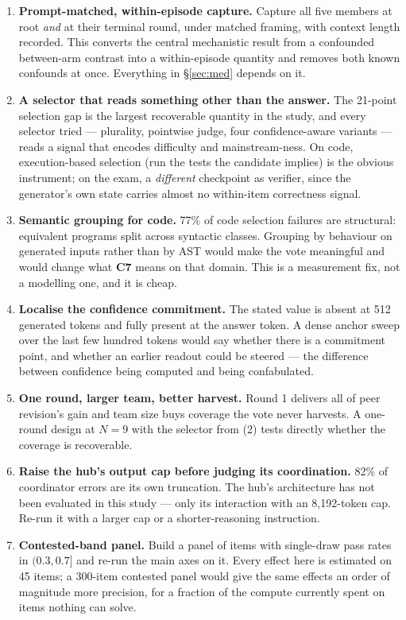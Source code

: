 \documentclass[10pt,a4paper]{article}
\newcommand{\ax}[1]{\textcolor{accent}{\textbf{#1}}}
\begin{document}
\begin{enumerate}
\item \textbf{Prompt-matched, within-episode capture.} Capture all five members at root \emph{and} at their terminal round, under matched framing, with context length recorded. This converts the central mechanistic result from a confounded between-arm contrast into a within-episode quantity and removes both known confounds at once. Everything in \S\ref{sec:med} depends on it.
\item \textbf{A selector that reads something other than the answer.} The 21-point selection gap is the largest recoverable quantity in the study, and every selector tried --- plurality, pointwise judge, four confidence-aware variants --- reads a signal that encodes difficulty and mainstream-ness. On code, execution-based selection (run the tests the candidate implies) is the obvious instrument; on the exam, a \emph{different} checkpoint as verifier, since the generator's own state carries almost no within-item correctness signal.
\item \textbf{Semantic grouping for code.} 77\% of code selection failures are structural: equivalent programs split across syntactic classes. Grouping by behaviour on generated inputs rather than by AST would make the vote meaningful and would change what \ax{C7} means on that domain. This is a measurement fix, not a modelling one, and it is cheap.
\item \textbf{Localise the confidence commitment.} The stated value is absent at 512 generated tokens and fully present at the answer token. A dense anchor sweep over the last few hundred tokens would say whether there is a commitment point, and whether an earlier readout could be steered --- the difference between confidence being computed and being confabulated.
\item \textbf{One round, larger team, better harvest.} Round 1 delivers all of peer revision's gain and team size buys coverage the vote never harvests. A one-round design at $N=9$ with the selector from (2) tests directly whether the coverage is recoverable.
\item \textbf{Raise the hub's output cap before judging its coordination.} 82\% of coordinator errors are its own truncation. The hub's architecture has not been evaluated in this study --- only its interaction with an 8{,}192-token cap. Re-run it with a larger cap or a shorter-reasoning instruction.
\item \textbf{Contested-band panel.} Build a panel of items with single-draw pass rates in $(0.3,0.7]$ and re-run the main axes on it. Every effect here is estimated on 45 items; a 300-item contested panel would give the same effects an order of magnitude more precision, for a fraction of the compute currently spent on items nothing can solve.

\end{enumerate}
\end{document}
